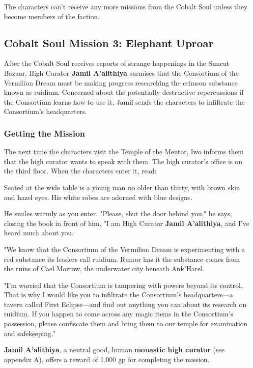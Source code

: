 \documentclass[10pt,a4paper,twoside,bg=print,twocolumn,openany,nodeprecatedcode]{dndbook}
\begin{document}
The characters can't receive any more missions from the Cobalt Soul unless they become members of the faction.

\subsection{Cobalt Soul Mission 3: Elephant Uproar}
After the Cobalt Soul receives reports of strange happenings in the Suncut Bazaar, High Curator \textbf{Jamil A'alithiya} surmises that the Consortium of the Vermilion Dream must be making progress researching the crimson substance known as ruidium. Concerned about the potentially destructive repercussions if the Consortium learns how to use it, Jamil sends the characters to infiltrate the Consortium's headquarters.

\subsubsection{Getting the Mission}
The next time the characters visit the Temple of the Mentor, Iwo informs them that the high curator wants to speak with them. The high curator's office is on the third floor. When the characters enter it, read:

\begin{DndReadAloud}{}
Seated at the wide table is a young man no older than thirty, with brown skin and hazel eyes. His white robes are adorned with blue designs.

He smiles warmly as you enter. "Please, shut the door behind you," he says, closing the book in front of him. "I am High Curator \textbf{Jamil A'alithiya}, and I've heard much about you.

"We know that the Consortium of the Vermilion Dream is experimenting with a red substance its leaders call ruidium. Rumor has it the substance comes from the ruins of Cael Morrow, the underwater city beneath Ank'Harel.

"I'm worried that the Consortium is tampering with powers beyond its control. That is why I would like you to infiltrate the Consortium's headquarters—a tavern called First Eclipse—and find out anything you can about its research on ruidium. If you happen to come across any magic items in the Consortium's possession, please confiscate them and bring them to our temple for examination and safekeeping."

\end{DndReadAloud}

\textbf{Jamil A'alithiya}, a neutral good, human \textbf{monastic high curator} (see appendix A), offers a reward of 1,000 gp for completing the mission.
\end{document}
